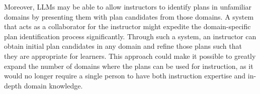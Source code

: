 Moreover, LLMs may be able to allow instructors to identify plans in unfamiliar domains by presenting them with plan candidates from those domains. 
A system that acts as a collaborator for the instructor might expedite the domain-specific plan identification process significantly. Through such a system, an instructor can obtain initial plan candidates in any domain and refine those plans such that they are appropriate for learners. This approach could make it possible to greatly expand the number of domains where the plans can be used for instruction, as it would no longer require a single person to have both instruction expertise and in-depth domain knowledge. 





